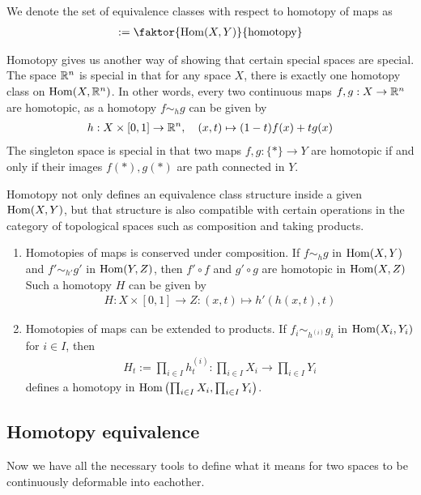 We denote the set of equivalence classes with respect to homotopy of maps as 
\begin{align*}
  [X,Y] := \faktor{\Hom(X,Y)}{\text{homotopy}}
\end{align*}

\begin{ex}[]
  Homotopy gives us another way of showing that certain special spaces are special.
  The space $\mathbb{R}^{n}$ is special in that for any space $X$, there is exactly one homotopy class on $\operatorname{Hom}(X,\mathbb{R}^{n})$. 
  In other words, every two continuous maps $f,g: X \to \mathbb{R}^{n}$ are homotopic, as a homotopy $f \sim_h g$ can be given by
  \begin{align*}
    h: X \times [0,1] \to \mathbb{R}^{n}, \quad (x,t) \mapsto  (1-t)f(x) + tg(x)
  \end{align*}
  The singleton space is special in that two maps $f,g: \{\ast\} \to Y$ are homotopic if and only if their images $f(\ast),g(\ast)$ are path connected in $Y$.
\end{ex}


\begin{lem}[]
  Homotopy not only defines an equivalence class structure inside a given $\operatorname{Hom}(X,Y)$, but that structure is also compatible with certain operations in the category of topological spaces such as composition and taking products.
  \begin{enumerate}
    \item Homotopies of maps is conserved under composition. 
      If $f\sim_h g$ in $\operatorname{Hom}(X,Y)$ and $f' \sim_{h'}g'$ in $\operatorname{Hom}(Y,Z)$, then $f' \circ f$ and $g' \circ g$ are homotopic in $\operatorname{Hom}(X,Z)$
      Such a homotopy $H$ can be given by
      \begin{align*}
        H: X \times [0,1] \to Z: (x,t) \mapsto  h'(h(x,t),t) 
      \end{align*}
    \item Homotopies of maps can be extended to products.
      If $f_i \sim_{h^{(i)}}g_i$ in $\operatorname{Hom}(X_i,Y_i)$ for $i \in I$, then 
      \begin{align*}
        H_t := \prod_{i \in I}h_t^{(i)}: \prod_{i \in I}X_i \to  \prod_{i \in I}Y_i
      \end{align*}
      defines a homotopy in $\operatorname{Hom}\left(\prod_{i \in I}X_i, \prod_{i \in I}Y_i\right)$.
  \end{enumerate}
\end{lem}


\subsection{Homotopy equivalence}
Now we have all the necessary tools to define what it means for two spaces to be continuously deformable into eachother.

